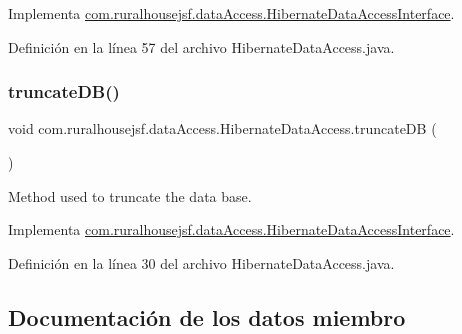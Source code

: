 Implementa \mbox{\hyperlink{interfacecom_1_1ruralhousejsf_1_1data_access_1_1_hibernate_data_access_interface_acab426a4933f3510c317816c136cec0b}{com.\+ruralhousejsf.\+data\+Access.\+Hibernate\+Data\+Access\+Interface}}.



Definición en la línea 57 del archivo Hibernate\+Data\+Access.\+java.

\mbox{\label{classcom_1_1ruralhousejsf_1_1data_access_1_1_hibernate_data_access_a81a5e60db58acfc1a3c1de2f014813d5}} 
\subsubsection{\texorpdfstring{truncateDB()}{truncateDB()}}
{\footnotesize\ttfamily void com.\+ruralhousejsf.\+data\+Access.\+Hibernate\+Data\+Access.\+truncate\+DB (\begin{DoxyParamCaption}{ }\end{DoxyParamCaption})}



Method used to truncate the data base. 



Implementa \mbox{\hyperlink{interfacecom_1_1ruralhousejsf_1_1data_access_1_1_hibernate_data_access_interface_a181eb91e600e57fe36301128022f535d}{com.\+ruralhousejsf.\+data\+Access.\+Hibernate\+Data\+Access\+Interface}}.



Definición en la línea 30 del archivo Hibernate\+Data\+Access.\+java.



\subsection{Documentación de los datos miembro}
\mbox{\label{classcom_1_1ruralhousejsf_1_1data_access_1_1_hibernate_data_access_a3f050c37956274b82491f5fcf9ce5db1}} 
